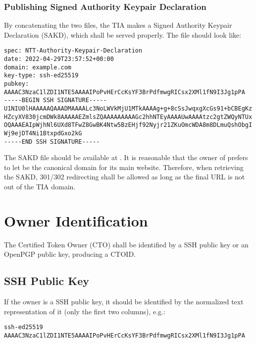 \documentclass[a4paper,10pt]{article}
\begin{document}
\subsubsection{Publishing Signed Authority Keypair Declaration}

By concatenating the two files, the TIA makes a Signed Authority Keypair Declaration (SAKD), which shall be served properly.
The file should look like:

\begin{lstlisting}
spec: NTT-Authority-Keypair-Declaration
date: 2022-04-29T23:57:52+00:00
domain: example.com
key-type: ssh-ed25519
pubkey: AAAAC3NzaC1lZDI1NTE5AAAAIPoPvHErCcKsYF3BrPdfmwgRICsx2XMl1fN9I3Jg1pPA
-----BEGIN SSH SIGNATURE-----
U1NIU0lHAAAAAQAAADMAAAALc3NoLWVkMjU1MTkAAAAg+g+8cSsJwqxgXcGs91+bCBEgKz
HZcyXV830jcmDWk8AAAAAEZmlsZQAAAAAAAAAGc2hhNTEyAAAAUwAAAAtzc2gtZWQyNTUx
OQAAAEAIpWjhNl6UXd8TFwZ8GwBK4Ntw5BzEHjf92Nyjr21ZKuOmcWDA8m8DLmuQshObgI
Wj9ejDT4Ni1BtxpdGxo2kG
-----END SSH SIGNATURE-----
\end{lstlisting}

The SAKD file should be available at .
It is reasonable that the owner of  prefers to let  be the canonical domain for its main website.
Therefore, when retrieving the SAKD, 301/302 redirecting shall be allowed as long as the final  URL is not out of the TIA domain.












\section{Owner Identification}

The Certified Token Owner (CTO) shall be identified by a SSH public key or an OpenPGP public key, producing a CTOID.


\subsection{SSH Public Key}

If the owner is a SSH public key, it should be identified by the normalized text representation of it (only the first two columns), e.g.:

\begin{lstlisting}
ssh-ed25519 AAAAC3NzaC1lZDI1NTE5AAAAIPoPvHErCcKsYF3BrPdfmwgRICsx2XMl1fN9I3Jg1pPA
\end{lstlisting}
\end{document}
